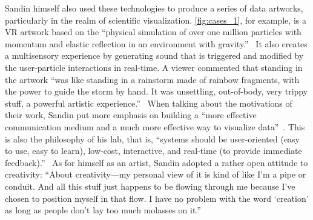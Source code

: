 
Sandin himself also used these technologies to produce a series of data artworks, particularly in the realm of scientific visualization. \autoref{fig:cases_1}, for example, is a VR artwork based on the ``physical simulation of over one million particles with momentum and elastic reflection in an environment with gravity.''~\cite{sandin}
It also creates a multisensory experience by generating sound that is triggered and modified by the user-particle interactions in real-time.
A viewer commented that standing in the artwork ``was like standing in a rainstorm made of rainbow fragments, with the power to guide the storm by hand. It was unsettling, out-of-body, very trippy stuff, a powerful artistic experience.''~\cite{evl_vr}
When talking about the motivations of their work, Sandin put more emphasis on building a ``more effective communication medium and a much more effective way to visualize data''~\cite{evl_synthesis}.
This is also the philosophy of his lab, that is, ``systems should be user-oriented (easy to use, easy to learn), low-cost, interactive, and real-time (to provide immediate feedback).''~\cite{johnson2024electronic}
As for himself as an artist, Sandin adopted a rather open attitude to creativity: ``About creativity—my personal view of it is kind of like I’m a pipe or conduit. And all this stuff just happens to be flowing through me because I’ve chosen to position myself in that flow. I have no problem with the word `creation' as long as people don’t lay too much molasses on it.''~\cite{vdb} 



